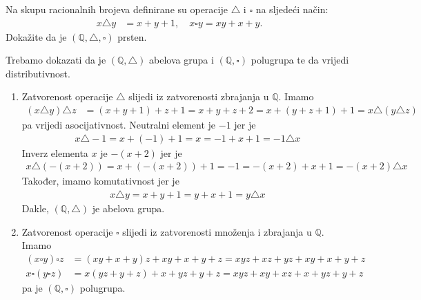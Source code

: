\documentclass{exam}
\begin{document}
\begin{questions}
\question Na skupu racionalnih brojeva definirane su operacije $\triangle$ i $\square$ na sljedeći način:
\begin{align*}
  x \triangle y &= x + y + 1, \quad x \square y = xy + x + y.
\end{align*}
Dokažite da je $(\mathbb{Q}, \triangle, \square)$ prsten.

\begin{solution}
  Trebamo dokazati da je $(\mathbb{Q}, \triangle)$ abelova grupa i $(\mathbb{Q}, \square)$ polugrupa te da vrijedi distributivnost.
  \begin{enumerate}
    \item Zatvorenost operacije $\triangle$ slijedi iz zatvorenosti zbrajanja u $\mathbb{Q}$. Imamo
      \begin{align*}
        (x \triangle y) \triangle z &= (x + y + 1) + z + 1 = x + y + z + 2 = x + (y + z + 1) + 1 = x \triangle (y \triangle z)
      \end{align*}
      pa vrijedi asocijativnost. Neutralni element je $-1$ jer je
      \begin{align*}
        x \triangle -1 = x + (-1) + 1 = x = -1 + x + 1 = -1 \triangle x
      \end{align*}
      Inverz elementa $x$ je $-(x + 2)$ jer je
      \begin{align*}
        x \triangle (-(x + 2)) = x + (-(x + 2)) + 1 = -1 = -(x + 2) + x + 1 = -(x + 2) \triangle x
      \end{align*}
      Također, imamo komutativnost jer je
      \begin{align*}
        x \triangle y = x + y + 1 = y + x + 1 = y \triangle x
      \end{align*}
      Dakle, $(\mathbb{Q}, \triangle)$ je abelova grupa.

    \item Zatvorenost operacije $\square$ slijedi iz zatvorenosti množenja i zbrajanja u $\mathbb{Q}$. Imamo
      \begin{align*}
        (x \square y) \square z &= (xy + x + y)z + xy + x + y + z= xyz + xz + yz + xy + x + y + z\\
        x \square (y \square z) &= x(yz + y + z) + x + yz + y + z = xyz + xy + xz + x + yz + y + z
      \end{align*}
      pa je $(\mathbb{Q}, \square)$ polugrupa.


\end{enumerate}
\end{solution}
\end{questions}
\end{document}
